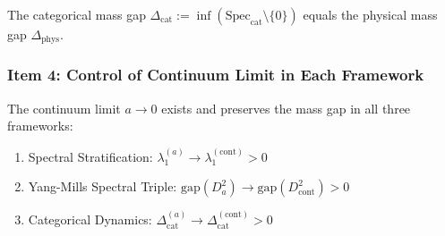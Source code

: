 \begin{corollary}
The categorical mass gap $\Delta_{\mathrm{cat}} := \inf(\mathrm{Spec}_{\mathrm{cat}} \setminus \{0\})$ 
equals the physical mass gap $\Delta_{\mathrm{phys}}$.
\end{corollary}

\subsubsection{Item 4: Control of Continuum Limit in Each Framework}

\begin{theorem}
\label{thm:unified-continuum}
The continuum limit $a \to 0$ exists and preserves the mass gap in all 
three frameworks:
\begin{enumerate}[label=(\alph*)]
\item Spectral Stratification: $\lambda_1^{(a)} \to \lambda_1^{(\mathrm{cont})} > 0$
\item Yang-Mills Spectral Triple: $\mathrm{gap}(D_a^2) \to \mathrm{gap}(D_{\mathrm{cont}}^2) > 0$
\item Categorical Dynamics: $\Delta_{\mathrm{cat}}^{(a)} \to \Delta_{\mathrm{cat}}^{(\mathrm{cont})} > 0$
\end{enumerate}
\end{theorem}

